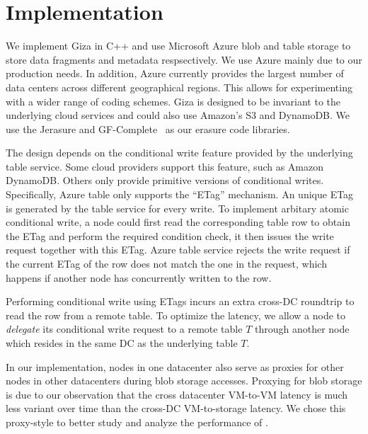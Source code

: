 \section{Implementation}
\label{sec:impl}

We implement Giza in C++ and use Microsoft Azure blob and table storage to store data fragments and metadata respsectively. We use Azure mainly 
due to our production needs. In addition, Azure currently provides the largest number 
of data centers across different geographical regions. This allows for experimenting 
with a wider range of coding schemes. Giza is designed to be invariant to the 
underlying cloud services and could also use Amazon's S3 and DynamoDB. 
We use the Jerasure and GF-Complete~\cite{Jerasure} as our erasure code libraries.

The \name design depends on the conditional write feature provided by the underlying 
table service. Some cloud providers support this feature, such as Amazon DynamoDB.
Others only provide primitive versions of conditional writes. Specifically, 
Azure table only supports the ``ETag'' mechanism. An unique ETag 
is generated by the table service for every write.  To implement arbitary atomic
conditional write, a \name node could first read the corresponding table row to
obtain the ETag and perform the required condition check, it then issues the
write request together with this ETag.  Azure table service rejects the
write request if the current ETag of the row does not match the one in the
request, which happens if another \name node has concurrently written to the row.  

Performing conditional write using ETags 
incurs an extra cross-DC roundtrip to read the row from a remote table.
To optimize the latency, we allow a \name node to \emph{delegate} its 
conditional write request to a remote table $T$ through another node which
resides in the same DC as the underlying table $T$.  

In our implementation, \name nodes in one datacenter also serve as proxies for
other nodes in other datacenters during blob storage accesses.  Proxying for
blob storage is due to our observation that the cross datacenter VM-to-VM
latency is much less variant over time than the cross-DC VM-to-storage latency.
We chose this proxy-style to better study and analyze the performance of \name.

